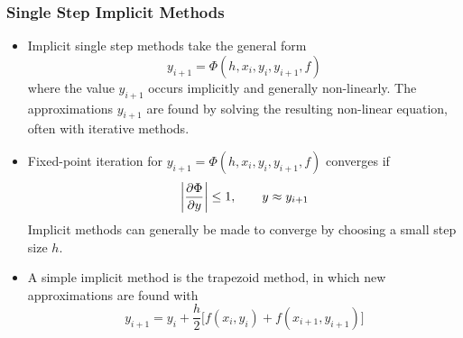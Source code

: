 \documentclass[11pt, a4paper]{article}
\begin{document}
\subsubsection{Single Step Implicit Methods}
\begin{itemize}
	\item Implicit single step methods take the general form
	\begin{equation*}
		y_{i+1} = \Phi(h, x_{i}, y_{i}, y_{i+1}, f)
	\end{equation*}
	where the value $ y_{i+1} $ occurs implicitly and generally non-linearly. The approximations $ y_{i+1} $ are found by solving the resulting non-linear equation, often with iterative methods.
	
	\item Fixed-point iteration for $ y_{i+1} = \Phi(h, x_{i}, y_{i}, y_{i+1}, f) $ converges if
	\begin{equation*}
		\abs{\pdv{\Phi}{y} (h, x_{i}, y_{i}, y, f)} \leq 1, \qquad y \approx y_{i+1}
	\end{equation*}
	Implicit methods can generally be made to converge by choosing a small step size $ h $.
	
	\item A simple implicit method is the trapezoid method, in which new approximations are found with
	\begin{equation*}
		y_{i+1} = y_{i} + \frac{h}{2}\big[f(x_{i}, y_{i}) + f(x_{i+1}, y_{i+1}) \big] 
	\end{equation*}
\end{itemize}
\end{document}
